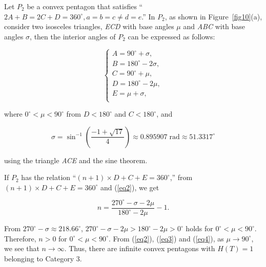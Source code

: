 \documentclass[11pt, a4paper]{article}
\begin{document}
Let $P_{2}$ be a convex pentagon that satisfies ``$2A+B = 2C+D = 360^ \circ, 
a = b = c \ne d = e$.'' In $P_{2}$, as shown in Figure~\ref{fig10}(a), consider two 
isosceles triangles, \textit{ECD} with base angles $\mu $ and \textit{ABC} with base 
angles $\sigma $, then the interior angles of $P_{2}$ can be expressed as follows:


\begin{equation}
\label{eq2}
\left\{ {\begin{array}{l}
 A = 90^ \circ + \sigma , \\ 
 B = 180^ \circ - 2\sigma , \\ 
 C = 90^ \circ + \mu , \\ 
 D = 180^ \circ - 2\mu , \\ 
 E = \mu + \sigma , \\ 
 \end{array}} \right.
\end{equation}





\noindent
where $0^ \circ < \mu < 90^ \circ $ from $D < 180^ \circ $ and $C < 180^ 
\circ $, and


\begin{equation}
\label{eq3}
\sigma = \sin ^{ - 1}\left( {\frac{ - 1 + \sqrt {17} }{4}} \right) \approx 
0.895907\;\mbox{rad} \approx 51.3317^ \circ 
\end{equation}





\noindent
using the triangle \textit{ACE} and the sine theorem.

If $P_{2}$ has the relation ``$(n + 1)\times D + C + E = 360^ \circ $,'' from 
$(n + 1)\times D + C + E = 360^ \circ $ and (\ref{eq2}), we get


\begin{equation}
\label{eq4}
n = \frac{270^ \circ - \sigma - 2\mu }{180^ \circ - 2\mu } - 1.
\end{equation}


\noindent
From $270^ \circ - \sigma \approx 218.66^ \circ $, 
$270^ \circ - \sigma - 2\mu > 180^ \circ - 2\mu > 0^ \circ $ holds 
for $0^ \circ < \mu < 90^ \circ $. Therefore, $n > 0$ for 
$0^ \circ < \mu < 90^ \circ $. From (\ref{eq2}), (\ref{eq3}) and (\ref{eq4}), 
as $\mu \to 90^ \circ $, we see that $n \to \infty $. Thus, there are 
infinite convex pentagons with $H(T) = 1$ belonging to Category 3.
\end{document}
